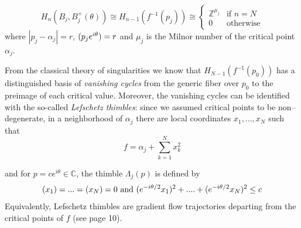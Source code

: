 \documentclass{article}
\let\Re\relax
\DeclareMathOperator{\Re}{Re}
\let\Im\relax
\DeclareMathOperator{\Im}{Im}
\theoremstyle{definition}
\newcommand{\Z}{\mathbb{Z}}
\newcommand{\C}{\mathbb{C}}
\begin{document}
\begin{equation}
    H_{n}(B_j, B_j^+(\theta))\cong H_{n-1}(f^{-1}(p_j))\cong \begin{cases} \Z^{\mu_j} & \text{if } n=N\\
     0 & \text{otherwise}
    \end{cases}
\end{equation}
where $|p_j-\alpha_j|=r$, $\Re(p_j e^{i\theta})=r$ and $\mu_j$ is the Milnor number of the critical point $\alpha_j$. 


\begin{center}
\end{center}

From the classical theory of singularities \cite{Arnold} we know that $H_{N-1}(f^{-1}(p_0))$ has a distinguished basis of \textit{vanishing cycles} from the generic fiber over $p_0$ to the preimage of each critical value. 
Moreover, the vanishing cycles can be identified with the so-called \textit{Lefschetz thimbles}: since we assumed critical points to be non--degenerate, in a neighborhood of $\alpha_j$ there are local coordinates $x_1,...,x_N$ such that 
\[f=\alpha_j+\sum_{k=1}^N x_k^2\]

and for $p=c e^{i\theta}\in\C$, the thimble $\Lambda_j(p)$ is defined by 
\begin{align*}
    \Im(x_1)=...=\Im(x_N)=0 \text{ and } \Re(e^{-i\theta/2}x_1)^2+....+\Re(e^{-i\theta/2}x_N)^2\leq c
\end{align*}
Equivalently, Lefschetz thimbles are gradient flow trajectories departing from the critical points of $f$ (see \cite{Witten} page 10).
\end{document}
